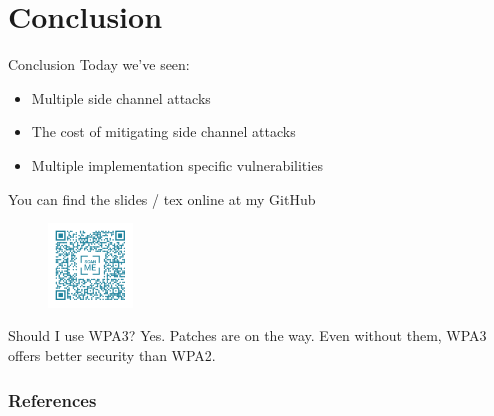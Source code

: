 \documentclass[xcolor=table]{bredelebeamer}
\begin{document}
\section{Conclusion}
\begin{frame}{Conclusion}
    Today we've seen:

\begin{itemize}
    \item Multiple side channel attacks
    \item The cost of mitigating side channel attacks
    \item Multiple implementation specific vulnerabilities
\end{itemize}
You can find the slides / tex online at my GitHub
\begin{figure}[H]
    \centering
    \includegraphics[width=0.2\textwidth]{frame.png}
    \label{fig:my_label}
\end{figure}
 \begin{exampleblock}{Should I use WPA3?}
 Yes. Patches are on the way. Even without them, WPA3 offers better security than WPA2.
 \end{exampleblock}
\end{frame}
\begin{frame}[allowframebreaks]
        \frametitle{References}
        \printbibliography
\end{frame}
\end{document}
